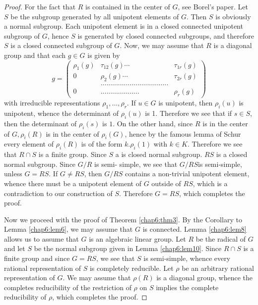 \begin{proof}
  For the fact that $R$ is contained in the center of $G$, see Borel's
  paper. Let $S$ be the subgroup generated by all unipotent elements
  of $G$. Then $S$ is obviously a normal subgroup. Each unipotent
  element is in a closed connected unipotent subgroup of $G$, hence
  $S$ is generated by closed connected subgroups, and therefore $S$ is
  a closed connected subgroup of $G$. Now, we may assume that $R$ is a
  diagonal group and that each $g \in G$ is given by  
  $$
  g=
  \begin{pmatrix}
    \rho_1(g) & \tau_{12} (g)\cdots & \tau_{1r}(g)\\
    0 & \rho_2(g) \cdots & \tau_{2r} (g)\\
    &...................................&\\
    0 &....................&\rho_r(g)
  \end{pmatrix}
  $$
with irreducible representations ${\rho_1, \ldots, \rho_r}$. If ${u
    \in G}$ is unipotent, then $\rho_i(u)$ is unipotent, whence the
  determinant of $ {\rho_i(u)}$ is 1. Therefore we see that if $s
  \in S$, then the determinant of $\rho_i (s)$ is $1$. On the other
  hand, since $R$ is in the center of $G, \rho_i (R)$ is in the center
  of $\rho_i (G)$, hence by the famous lemma of Schur every element of
  $\rho_i(R)$ is of the form $k.\rho_i(1)$ with $k \in K$. Therefore
  we see that $R \cap S$ is a finite group. Since $S$ a is closed
  normal subgroup. $RS$ is a closed normal subgroup. Since $G/R$ is
  semi- simple, we see that $G/RS$\pageoriginale is semi-simple,
  unless $G= RS$. If 
  $G \neq RS$, then $G/RS$ contains a non-trivial unipotent element,  whence
  there must be a unipotent element of $G$ outside of $RS$, which is a
  contradiction to our construction of $S$. Therefore $G=RS $, which
  completes  the proof. 
  
  Now we proceed with the proof of Theorem \ref{chap6:thm3}. By the Corollary to
  Lemma \ref{chap6:lem6},  we may assume that $G$ is connected.  Lemma
  \ref{chap6:lem8} allows 
  us to assume that $G$ is an algebraic linear group. Let $R$ be the
  radical of $G$ and let $S$ be the normal subgroup given in Lemma
  \ref{chap6:lem10}. Since $R \cap S$ is a finite group and since $G=RS$, we see
  that $S$ is semi-simple, whence every rational representation of
  $S$ is completely reducible. Let $\rho$ be an arbitrary rational
  representation of $G$. We may assume  that $\rho(R)$ is a diagonal
  group, whence the completes reducibility of the restriction of $\rho$
  on $S$ implies the complete reducibility of $\rho$, which completes
  the proof. 
\end{proof}

